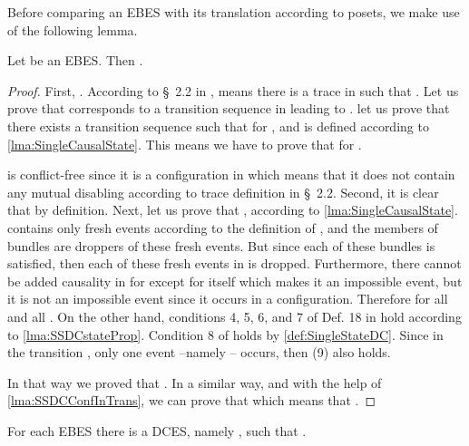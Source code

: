 \documentclass[runningheads,a4paper]{llncs}
\begin{document}
Before comparing an EBES with its translation according to posets, we make use
of the following lemma.

\begin{lemma}
\label{thm:EBESandEBDCconfigEqui}
Let  be an EBES. Then .
\end{lemma}

\begin{proof}
First, . According to \S~2.2 in \cite{dynamicCausality15},
 means there is a trace  in 
such that . Let us prove that  corresponds to a transition
sequence in  leading to . \ie let us prove that there exists a
transition sequence  such that  for , and
 is defined according to \lem\ref{lma:SingleCausalState}. This means we have
to prove that  for .

 is conflict-free since it is a configuration in  which means that it does not contain any mutual
disabling according to trace definition in \S~2.2. Second, it is clear
that  by definition. Next, let us prove that
, \ie
 according
to \lem\ref{lma:SingleCausalState}.
 contains only fresh events according to the definition of ,
and the members of bundles  are droppers of these fresh events.
But since each of these bundles is satisfied, then each of these fresh events in
 is dropped. Furthermore, there cannot be added causality in 
for  except for  itself which makes it an impossible event, but it is not an impossible event since it occurs in a
configuration. Therefore  for
all  and all . On the other hand, conditions
4, 5, 6, and 7 of
Def. 18 in \cite{dynamicCausality15} hold according to \lem\ref{lma:SSDCstateProp}.
Condition 8 of  holds by \ref{def:SingleStateDC}.
Since in the transition , only one
event --namely -- occurs, then (9) also holds.

In that way we proved that . In a similar way, and with the help of
\lem\ref{lma:SSDCConfInTrans}, we can prove that
 which means that .
\end{proof}

\begin{lemma}
\label{lma:EBESintoEBDC}
For each EBES  there is a DCES, namely , such that
.
\end{lemma}
\end{document}
